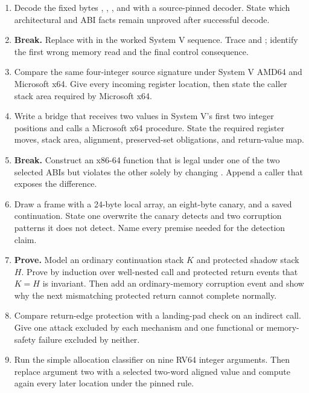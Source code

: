\begin{enumerate}
\item Decode the fixed bytes , , , and
 with a source-pinned decoder. State which architectural and ABI facts
remain unproved after successful decode.

\item \textbf{Break.} Replace  with  in the
worked System V sequence. Trace  and ; identify the first
wrong memory read and the final control consequence.

\item Compare the same four-integer source signature under System V AMD64 and
Microsoft x64. Give every incoming register location, then state the caller
stack area required by Microsoft x64.

\item Write a bridge that receives two values in System V's first two integer
positions and calls a Microsoft x64 procedure. State the required register
moves, stack area, alignment, preserved-set obligations, and return-value map.

\item \textbf{Break.} Construct an x86-64 function that is legal under one of
the two selected ABIs but violates the other solely by changing .
Append a caller that exposes the difference.

\item Draw a frame with a 24-byte local array, an eight-byte canary, and a
saved continuation. State one overwrite the canary detects and two corruption
patterns it does not detect. Name every premise needed for the detection claim.

\item \textbf{Prove.} Model an ordinary continuation stack \(K\) and protected
shadow stack \(H\). Prove by induction over well-nested call and protected
return events that \(K=H\) is invariant. Then add an ordinary-memory corruption
event and show why the next mismatching protected return cannot complete
normally.

\item Compare return-edge protection with a landing-pad check on an indirect
call. Give one attack excluded by each mechanism and one functional or
memory-safety failure excluded by neither.

\item Run the simple allocation classifier on nine RV64 integer arguments.
Then replace argument two with a selected two-word aligned value and compute
again
every later location under the pinned rule.


\end{enumerate}
